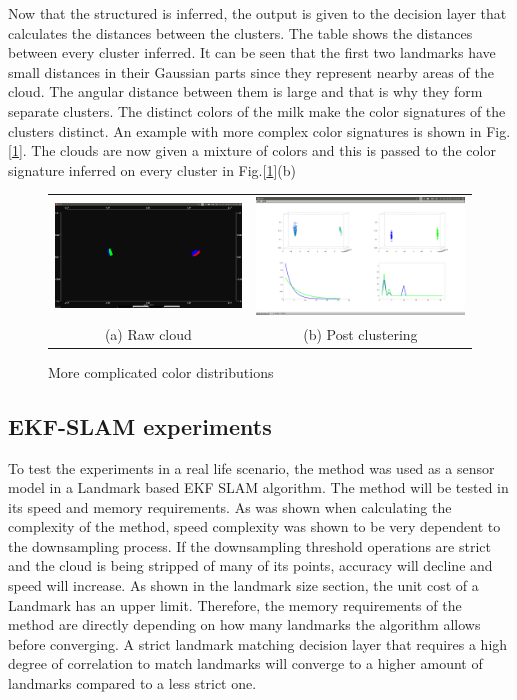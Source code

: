 \documentclass[twoside,hidelinks]{article}
\begin{document}
Now that the structured is inferred, the output is given to the decision layer that calculates the distances between the clusters. The table shows the distances between every cluster inferred. It can be seen that the first two landmarks have small distances in their Gaussian parts since they represent nearby areas of the cloud. The angular distance between them is large and that is why they form separate clusters. The distinct colors of the milk make the color signatures of the clusters distinct. An example with more complex color signatures is shown in Fig.[\ref{pcl:clust2}]. The clouds are now given a mixture of colors and this is passed to the color signature inferred on every cluster in Fig.[\ref{pcl:clust2}](b)



\begin{figure}
\begin{tabular}{cc}
  \includegraphics[width=.5\textwidth]{clusterings/coloursSource} &   \includegraphics[width=.5\textwidth]{clusterings/coloursCorrect} \\
(a) Raw cloud  & (b) Post clustering \\[6pt]
\end{tabular}
\caption{More complicated color distributions}
  \label{pcl:clust2}
\end{figure}


\subsection{EKF-SLAM experiments}

To test the experiments in a real life scenario, the method was used as a sensor model in a Landmark based EKF SLAM algorithm. The method will be tested in its speed and memory requirements. As was shown when calculating the complexity of the method, speed complexity was shown to be very dependent to the downsampling process. If the downsampling threshold operations are strict and the cloud is being stripped of many of its points, accuracy will decline and speed will increase. As shown in the landmark size section, the unit cost of a Landmark has an upper limit. Therefore, the memory requirements of the method are directly depending on how many landmarks the algorithm allows before converging. A strict landmark matching decision layer that requires a high degree of correlation to match landmarks will converge to a higher amount of landmarks compared to a less strict one.
\end{document}
